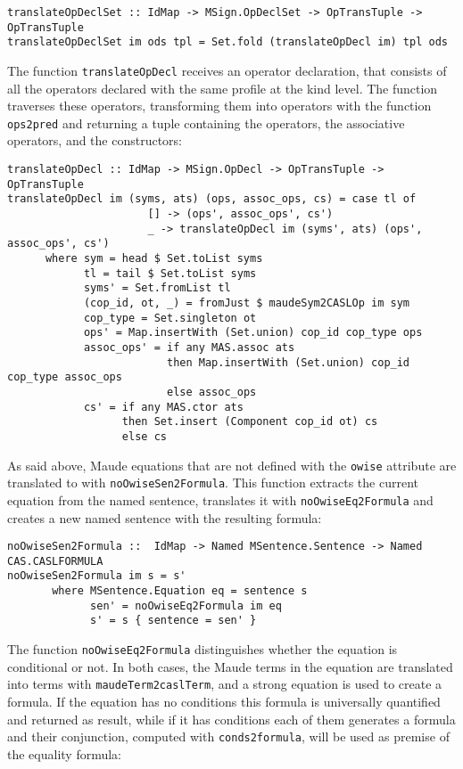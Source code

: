 {\codesize
\begin{verbatim}
translateOpDeclSet :: IdMap -> MSign.OpDeclSet -> OpTransTuple -> OpTransTuple
translateOpDeclSet im ods tpl = Set.fold (translateOpDecl im) tpl ods
\end{verbatim}
}

The function \verb"translateOpDecl" receives an operator declaration,
that consists of all the operators declared with the same profile at
the kind level. The function traverses these operators, transforming
them into \CASL operators with the function \verb"ops2pred" and returning
a tuple containing the operators, the associative operators, and the
constructors:

{\codesize
\begin{verbatim}
translateOpDecl :: IdMap -> MSign.OpDecl -> OpTransTuple -> OpTransTuple
translateOpDecl im (syms, ats) (ops, assoc_ops, cs) = case tl of
                      [] -> (ops', assoc_ops', cs')
                      _ -> translateOpDecl im (syms', ats) (ops', assoc_ops', cs')
      where sym = head $ Set.toList syms
            tl = tail $ Set.toList syms
            syms' = Set.fromList tl
            (cop_id, ot, _) = fromJust $ maudeSym2CASLOp im sym
            cop_type = Set.singleton ot
            ops' = Map.insertWith (Set.union) cop_id cop_type ops
            assoc_ops' = if any MAS.assoc ats
                         then Map.insertWith (Set.union) cop_id cop_type assoc_ops
                         else assoc_ops
            cs' = if any MAS.ctor ats
                  then Set.insert (Component cop_id ot) cs
                  else cs
\end{verbatim}
}

As said above, Maude equations that are not defined with the \verb"owise"
attribute are translated to \CASL with \verb"noOwiseSen2Formula". This
function extracts the current equation from the named sentence, translates
it with \verb"noOwiseEq2Formula" and creates a new named sentence
with the resulting formula:

{\codesize
\begin{verbatim}
noOwiseSen2Formula ::  IdMap -> Named MSentence.Sentence -> Named CAS.CASLFORMULA
noOwiseSen2Formula im s = s'
       where MSentence.Equation eq = sentence s
             sen' = noOwiseEq2Formula im eq
             s' = s { sentence = sen' }
\end{verbatim}
}

The function \verb"noOwiseEq2Formula" distinguishes whether the equation
is conditional or not. In both cases, the Maude terms in the equation
are translated into \CASL terms with \verb"maudeTerm2caslTerm", and a
strong equation is used to create a formula. If the equation has no
conditions this formula is universally quantified and returned as result,
while if it has conditions each of them generates a formula and their
conjunction, computed with \verb"conds2formula", will be used as premise
of the equality formula:

